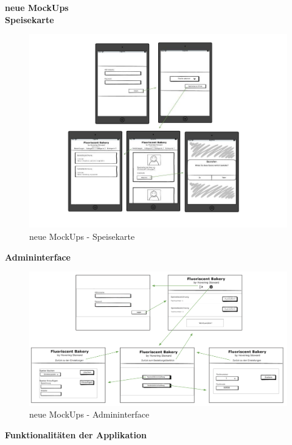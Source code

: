 \\ \\
\textbf{neue MockUps}\\
\textbf{Speisekarte}\\
			\begin{figure}[H]
			\begin{centering}
			\includegraphics[width = 1\textwidth]{Bilder/Jok_neue_mockups.jpg}
			\par\end{centering}
			\caption{neue MockUps - Speisekarte}
			\label{neue MockUps - Speisekarte}
			\end{figure}\textbf{Admininterface}\\
			\begin{figure}[H]
			\begin{centering}
			\includegraphics[width = 1\textwidth]{Bilder/Jok_neue_mockups_admin.png}
			\par\end{centering}
			\caption{neue MockUps - Admininterface}
			\label{neue MockUps - Admininterface}
			\end{figure}\textbf{Funktionalitäten der Applikation}\\
